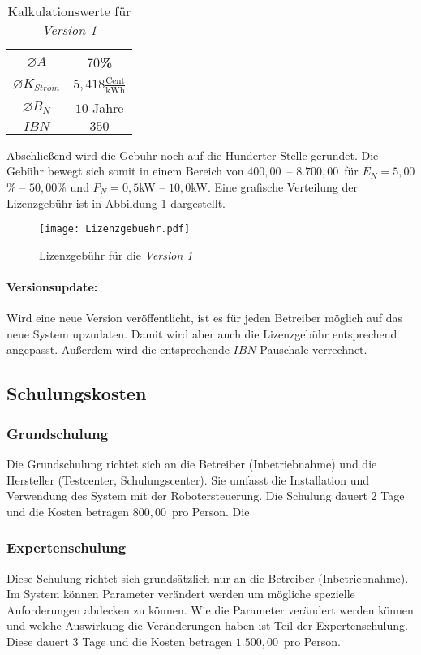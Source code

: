 \begin{table}[h]
	\centering
	\begin{tabular}{|c|c|}
		\hline 
		$\varnothing A$ & $70$\% \\ 
		\hline 
		$\varnothing K_{Strom}$ & $5,418\frac{\text{Cent}}{\text{kWh}}$ \\ 
		\hline
		$\varnothing B_N$ & $10$ Jahre \\ 
		\hline 
		$IBN$ & $350$\officialeuro \\ 
		\hline 
	\end{tabular}
	\caption{Kalkulationswerte für \textit{Version 1}}
	\label{tab:Kalkulationswerte}
\end{table}
Abschließend wird die Gebühr noch auf die Hunderter-Stelle gerundet. Die Gebühr bewegt sich somit in einem Bereich von $400,00$\officialeuro~-- $8.700,00$\officialeuro~für $E_N = 5,00$\% -- $50,00$\% und $P_N = 0,5$kW -- $10,0$kW. Eine grafische Verteilung der Lizenzgebühr ist in Abbildung \ref{fig:lizenzgebuehr} dargestellt.

\begin{figure}[h]
	\centering
	\texttt{[image: Lizenzgebuehr.pdf]}
	\caption{Lizenzgebühr für die \textit{Version 1}}
	\label{fig:lizenzgebuehr}
\end{figure}

\paragraph*{Versionsupdate:}
Wird eine neue Version veröffentlicht, ist es für jeden Betreiber möglich auf das neue System upzudaten. Damit wird aber auch die Lizenzgebühr entsprechend angepasst. Außerdem wird die entsprechende $IBN$-Pauschale verrechnet.

\subsection{Schulungskosten}
\subsubsection{Grundschulung}
Die Grundschulung richtet sich an die Betreiber (Inbetriebnahme) und die Hersteller (Testcenter, Schulungscenter). Sie umfasst die Installation und Verwendung des System mit der Robotersteuerung. Die Schulung dauert 2 Tage und die Kosten betragen $800,00$\officialeuro~pro Person. Die 

\subsubsection{Expertenschulung}
Diese Schulung richtet sich grundsätzlich nur an die Betreiber (Inbetriebnahme). Im System können Parameter verändert werden um mögliche spezielle Anforderungen abdecken zu können. Wie die Parameter verändert werden können und welche Auswirkung die Veränderungen haben ist Teil der Expertenschulung. Diese dauert 3 Tage und die Kosten betragen $1.500,00$\officialeuro~pro Person.

